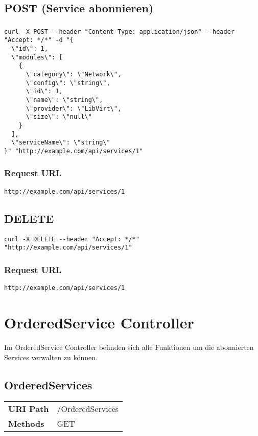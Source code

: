\subsection{POST (Service abonnieren)}
\subsubsection{}
\begin{lstlisting}[style=Bash] 
curl -X POST --header "Content-Type: application/json" --header "Accept: */*" -d "{
  \"id\": 1,
  \"modules\": [
    {
      \"category\": \"Network\",
      \"config\": \"string\",
      \"id\": 1,
      \"name\": \"string\",
      \"provider\": \"LibVirt\",
      \"size\": \"null\"
    }
  ],
  \"serviceName\": \"string\"
}" "http://example.com/api/services/1"
\end{lstlisting}

\subsubsection{Request URL}
\begin{lstlisting}[] 
http://example.com/api/services/1
\end{lstlisting}




\subsection{DELETE}
\begin{lstlisting}[style=Bash] 
  curl -X DELETE --header "Accept: */*" "http://example.com/api/services/1"
\end{lstlisting}

\subsubsection{Request URL}
\begin{lstlisting}[] 
http://example.com/api/services/1
\end{lstlisting}

\section{OrderedService Controller}
Im OrderedService Controller befinden sich alle Funktionen um die abonnierten 
Services verwalten zu können.
\subsection{OrderedServices}
\begin{tabularx}{\linewidth}{l l}
\textbf{URI Path} & /OrderedServices\\
\textbf{Methods} & GET\\
\end{tabularx}

